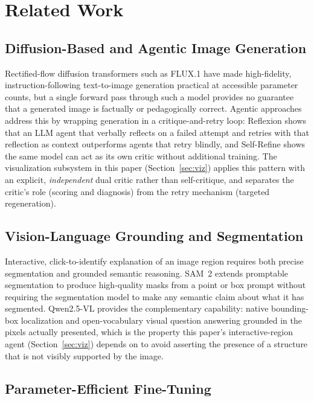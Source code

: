 \documentclass[conference]{IEEEtran}
\begin{document}
\section{Related Work}
\label{sec:related}

\subsection{Diffusion-Based and Agentic Image Generation}

Rectified-flow diffusion transformers such as FLUX.1 \cite{flux} have made high-fidelity, instruction-following text-to-image generation practical at accessible parameter counts, but a single forward pass through such a model provides no guarantee that a generated image is factually or pedagogically correct. Agentic approaches address this by wrapping generation in a critique-and-retry loop: Reflexion \cite{reflexion} shows that an LLM agent that verbally reflects on a failed attempt and retries with that reflection as context outperforms agents that retry blindly, and Self-Refine \cite{selfrefine} shows the same model can act as its own critic without additional training. The visualization subsystem in this paper (Section~\ref{sec:viz}) applies this pattern with an explicit, \emph{independent} dual critic rather than self-critique, and separates the critic's role (scoring and diagnosis) from the retry mechanism (targeted regeneration).

\subsection{Vision-Language Grounding and Segmentation}

Interactive, click-to-identify explanation of an image region requires both precise segmentation and grounded semantic reasoning. SAM~2 \cite{sam2} extends promptable segmentation to produce high-quality masks from a point or box prompt without requiring the segmentation model to make any semantic claim about what it has segmented. Qwen2.5-VL \cite{qwen25vl} provides the complementary capability: native bounding-box localization and open-vocabulary visual question answering grounded in the pixels actually presented, which is the property this paper's interactive-region agent (Section~\ref{sec:viz}) depends on to avoid asserting the presence of a structure that is not visibly supported by the image.

\subsection{Parameter-Efficient Fine-Tuning}
\end{document}
